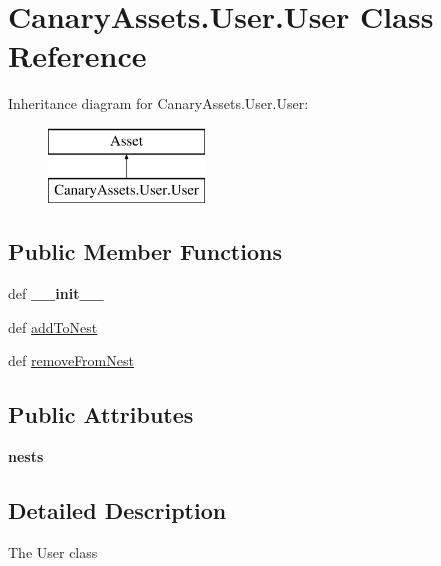 \hypertarget{class_canary_assets_1_1_user_1_1_user}{\section{Canary\-Assets.\-User.\-User Class Reference}
\label{class_canary_assets_1_1_user_1_1_user}
}
Inheritance diagram for Canary\-Assets.\-User.\-User\-:\begin{figure}[H]
\begin{center}
\leavevmode
\includegraphics[height=2.000000cm]{class_canary_assets_1_1_user_1_1_user}
\end{center}
\end{figure}
\subsection*{Public Member Functions}
\begin{DoxyCompactItemize}
\item 
\hypertarget{class_canary_assets_1_1_user_1_1_user_af4ad306fd8dc77414541b293416f698c}{def {\bfseries \-\_\-\-\_\-init\-\_\-\-\_\-}}\label{class_canary_assets_1_1_user_1_1_user_af4ad306fd8dc77414541b293416f698c}

\item 
def \hyperlink{class_canary_assets_1_1_user_1_1_user_a1a73be79bd9c9360c51059ce7eaf2878}{add\-To\-Nest}
\item 
def \hyperlink{class_canary_assets_1_1_user_1_1_user_afa43d2b1b97ee68a8361c9e069eea374}{remove\-From\-Nest}
\end{DoxyCompactItemize}
\subsection*{Public Attributes}
\begin{DoxyCompactItemize}
\item 
\hypertarget{class_canary_assets_1_1_user_1_1_user_a488d6c32bf529e8a067285ce019aeca3}{{\bfseries nests}}\label{class_canary_assets_1_1_user_1_1_user_a488d6c32bf529e8a067285ce019aeca3}

\end{DoxyCompactItemize}


\subsection{Detailed Description}
\begin{DoxyVerb}The User class\end{DoxyVerb}
 

